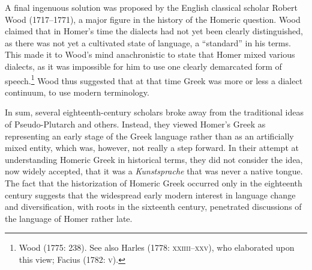 \documentclass[12pt]{article}
\newenvironment{styleStandard}{\renewcommand\baselinestretch{1.25}\setlength\leftskip{0in}\setlength\rightskip{0in}\setlength\parindent{0.1972in}\setlength\parfillskip{0pt plus 1fil}\setlength\parskip{0in plus 1pt}\writerlistparindent\writerlistleftskip\leavevmode\normalfont\normalsize\writerlistlabel\ignorespaces}{\unskip\vspace{0in plus 1pt}\par}
\newcommand\writerlistleftskip{}
\newcommand\writerlistparindent{}
\newcommand\writerlistlabel{}
\begin{document}
\begin{styleStandard}
A final ingenuous solution was proposed by the English classical scholar Robert Wood (1717–1771), a major figure in the history of the Homeric question. Wood claimed that in Homer’s time the dialects had not yet been clearly distinguished, as there was not yet a cultivated state of language, a “standard” in his terms. This made it to Wood’s mind anachronistic to state that Homer mixed various dialects, as it was impossible for him to use one clearly demarcated form of speech.\footnote{ Wood (1775: 238). See also Harles (1778: \textsc{xxiiii–xxv)}, who elaborated upon this view; Facius (1782: \textsc{v}).} Wood thus suggested that at that time Greek was more or less a dialect continuum, to use modern terminology.
\end{styleStandard}

\begin{styleStandard}
In sum, several eighteenth-century scholars broke away from the traditional ideas of Pseudo-Plutarch and others. Instead, they viewed Homer’s Greek as representing an early stage of the Greek language rather than as an artificially mixed entity, which was, however, not really a step forward. In their attempt at understanding Homeric Greek in historical terms, they did not consider the idea, now widely accepted, that it was a \textit{Kunstsprache} that was never a native tongue. The fact that the historization of Homeric Greek occurred only in the eighteenth century suggests that the widespread early modern interest in language change and diversification, with roots in the sixteenth century, penetrated discussions of the language of Homer rather late.
\end{styleStandard}
\end{document}
